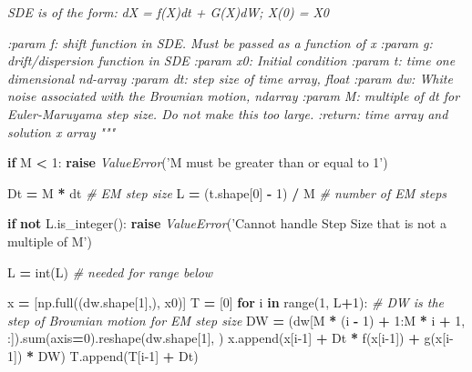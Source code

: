 \documentclass[]{article}
\newenvironment{Shaded}{\begin{snugshade}}{\end{snugshade}}
\newcommand{\BuiltInTok}[1]{#1}
\newcommand{\CommentTok}[1]{\textcolor[rgb]{0.56,0.35,0.01}{\textit{#1}}}
\newcommand{\ControlFlowTok}[1]{\textcolor[rgb]{0.13,0.29,0.53}{\textbf{#1}}}
\newcommand{\DecValTok}[1]{\textcolor[rgb]{0.00,0.00,0.81}{#1}}
\newcommand{\KeywordTok}[1]{\textcolor[rgb]{0.13,0.29,0.53}{\textbf{#1}}}
\newcommand{\NormalTok}[1]{#1}
\newcommand{\OperatorTok}[1]{\textcolor[rgb]{0.81,0.36,0.00}{\textbf{#1}}}
\newcommand{\PreprocessorTok}[1]{\textcolor[rgb]{0.56,0.35,0.01}{\textit{#1}}}
\newcommand{\StringTok}[1]{\textcolor[rgb]{0.31,0.60,0.02}{#1}}
\begin{document}
\begin{Shaded}
\begin{Highlighting}[]
\CommentTok{    SDE is of the form:}
\CommentTok{    dX = f(X)dt + G(X)dW; X(0) = X0}

\CommentTok{    :param f: shift function in SDE. Must be passed as a function of x}
\CommentTok{    :param g: drift/dispersion function in SDE}
\CommentTok{    :param x0: Initial condition}
\CommentTok{    :param t: time one dimensional nd-array}
\CommentTok{    :param dt: step size of time array, float}
\CommentTok{    :param dw: White noise associated with the Brownian motion, ndarray}
\CommentTok{    :param M: multiple of dt for Euler-Maruyama step size. Do not make this too large.}
\CommentTok{    :return: time array and solution x array}
\CommentTok{    """}

    \ControlFlowTok{if}\NormalTok{ M }\OperatorTok{<} \DecValTok{1}\NormalTok{:}
        \ControlFlowTok{raise} \PreprocessorTok{ValueError}\NormalTok{(}\StringTok{'M must be greater than or equal to 1'}\NormalTok{)}

\NormalTok{    Dt }\OperatorTok{=}\NormalTok{ M }\OperatorTok{*}\NormalTok{ dt  }\CommentTok{# EM step size}
\NormalTok{    L }\OperatorTok{=}\NormalTok{ (t.shape[}\DecValTok{0}\NormalTok{] }\OperatorTok{-} \DecValTok{1}\NormalTok{) }\OperatorTok{/}\NormalTok{ M  }\CommentTok{# number of EM steps}

    \ControlFlowTok{if} \KeywordTok{not}\NormalTok{ L.is_integer():}
        \ControlFlowTok{raise} \PreprocessorTok{ValueError}\NormalTok{(}\StringTok{'Cannot handle Step Size that is not a multiple of M'}\NormalTok{)}

\NormalTok{    L }\OperatorTok{=} \BuiltInTok{int}\NormalTok{(L)  }\CommentTok{# needed for range below}

\NormalTok{    x }\OperatorTok{=}\NormalTok{ [np.full((dw.shape[}\DecValTok{1}\NormalTok{],), x0)]}
\NormalTok{    T }\OperatorTok{=}\NormalTok{ [}\DecValTok{0}\NormalTok{]}
    \ControlFlowTok{for}\NormalTok{ i }\KeywordTok{in} \BuiltInTok{range}\NormalTok{(}\DecValTok{1}\NormalTok{, L}\OperatorTok{+}\DecValTok{1}\NormalTok{):}
        \CommentTok{# DW is the step of Brownian motion for EM step size}
\NormalTok{        DW }\OperatorTok{=}\NormalTok{ (dw[M }\OperatorTok{*}\NormalTok{ (i }\OperatorTok{-} \DecValTok{1}\NormalTok{) }\OperatorTok{+} \DecValTok{1}\NormalTok{:M }\OperatorTok{*}\NormalTok{ i }\OperatorTok{+} \DecValTok{1}\NormalTok{, :]).}\BuiltInTok{sum}\NormalTok{(axis}\OperatorTok{=}\DecValTok{0}\NormalTok{).reshape(dw.shape[}\DecValTok{1}\NormalTok{], )}
\NormalTok{        x.append(x[i}\DecValTok{-1}\NormalTok{] }\OperatorTok{+}\NormalTok{ Dt }\OperatorTok{*}\NormalTok{ f(x[i}\DecValTok{-1}\NormalTok{]) }\OperatorTok{+}\NormalTok{ g(x[i}\DecValTok{-1}\NormalTok{]) }\OperatorTok{*}\NormalTok{ DW)}
\NormalTok{        T.append(T[i}\DecValTok{-1}\NormalTok{] }\OperatorTok{+}\NormalTok{ Dt)}


\end{Highlighting}
\end{Shaded}
\end{document}
